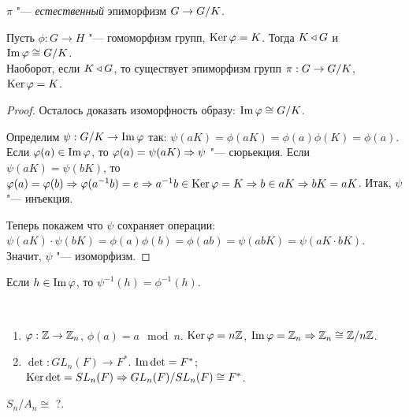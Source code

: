 \documentclass[main]{subfiles}
\begin{document}
\begin{definition}
  $\pi$ "--- \emph{естественный} эпиморфизм $G \to \Factor{G}[K]$.
\end{definition}

\begin{theorem}
  Пусть $\phi : G \to H$ "--- гомоморфизм групп, $\operatorname{Ker} \varphi = K$.
  Тогда $K \triangleleft G$ и $\Img \phi \cong \Factor{G}[K]$. \\
  Наоборот, если $K \triangleleft G$,
  то существует эпиморфизм групп $\pi : G \to \Factor{G}[K]$,
  $\operatorname{Ker} \varphi = K$.
\end{theorem}
\begin{proof}
  Осталось доказать изоморфность образу: $\Img \phi \cong \Factor{G}[K]$.

  Определим $\psi: \Factor{G}[K] \to \Img \phi$ так:
  $\psi(aK) = \phi(aK) =
  \phi(a) \phi(K) = \phi(a)$.
  Если $\varphi(a) \in \operatorname{Im} \varphi$,
  то $\varphi(a) = \psi(aK) \Rightarrow \psi$ "--- сюрьекция.
  Если $\psi(aK) = \psi(bK)$, то
  $\varphi(a) = \varphi(b) \Rightarrow \varphi(a^{-1} b) = e \Rightarrow
  a^{-1} b \in \operatorname{Ker} \varphi = K
  \Rightarrow b \in aK \Rightarrow bK = aK$.
  Итак, $\psi$ "--- инъекция.

  Теперь покажем
  что $\psi$ сохраняет операции:
  $\psi(aK) \cdot \psi(bK) =
  \phi(a) \phi(b) = \phi(ab) = \psi(abK) = \psi(aK \cdot bK)$.
  Значит, $\psi$ "--- изоморфизм.
\end{proof}

\begin{remark}
  Если $h \in \operatorname{Im} \varphi$, то $\psi^{-1}(h) = \phi^{-1}(h)$.
\end{remark}

\begin{examples}~
  \begin{enumerate}
    \item $\varphi : \mathbb{Z} \to \mathbb{Z}_n$, $\phi(a) = a \mod{n}$. $\operatorname{Ker}\varphi = n\mathbb{Z}$,
      $\operatorname{Im} \varphi = \mathbb{Z}_n \Rightarrow \mathbb{Z}_n \cong \mathbb{Z}/n\mathbb{Z}$.
    \item $\det: GL_n(F) \to F^*$. $\operatorname{Im} \det = F^*$; $\operatorname{Ker} \det = SL_n(F) \Rightarrow
      GL_n(F)/SL_n(F) \cong F^*$.
  \end{enumerate}
\end{examples}

\begin{exercise}
  $S_n/A_n \cong$ ?.
\end{exercise}
\end{document}
